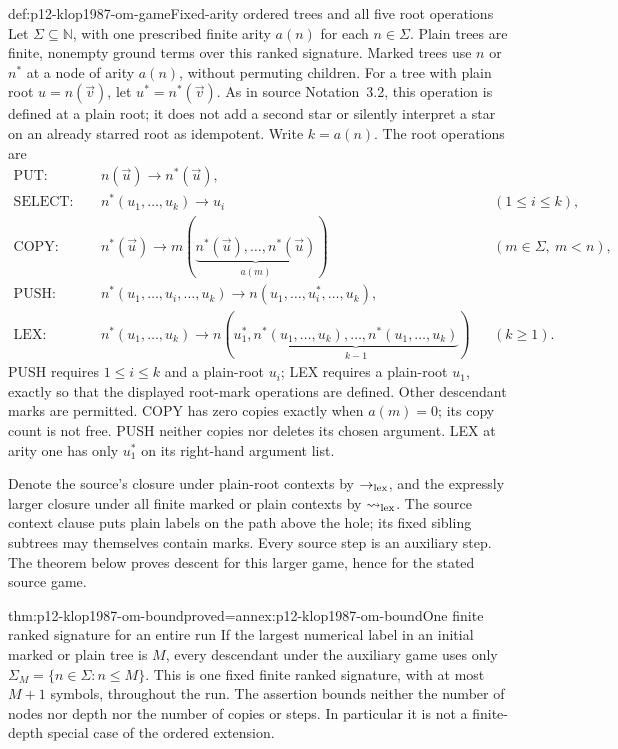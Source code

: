 \begin{hbdefinition}{def:p12-klop1987-om-game}{Fixed-arity ordered trees and all five root operations}
Let \(\Sigma\subseteq\mathbb N\), with one prescribed finite arity
\(a(n)\) for each \(n\in\Sigma\). Plain trees are finite, nonempty
ground terms over this ranked signature. Marked trees use \(n\) or
\(n^*\) at a node of arity \(a(n)\), without permuting children.
For a tree with plain root \(u=n(\vec v)\), let
\(u^*=n^*(\vec v)\). As in source Notation~3.2, this operation is
defined at a plain root; it does not add a second star or silently
interpret a star on an already starred root as idempotent.
Write \(k=a(n)\). The root operations are
\begin{align*}
 \mathrm{PUT}:\quad &n(\vec u)\longrightarrow n^*(\vec u),\\
 \mathrm{SELECT}:\quad &n^*(u_1,\ldots,u_k)\longrightarrow u_i
       &&(1\leq i\leq k),\\
 \mathrm{COPY}:\quad &n^*(\vec u)\longrightarrow
       m(\underbrace{n^*(\vec u),\ldots,n^*(\vec u)}_{a(m)})
       &&(m\in\Sigma,\ m<n),\\
 \mathrm{PUSH}:\quad &n^*(u_1,\ldots,u_i,\ldots,u_k)
       \longrightarrow n(u_1,\ldots,u_i^*,\ldots,u_k),\\
 \mathrm{LEX}:\quad &n^*(u_1,\ldots,u_k)\longrightarrow
       n(u_1^*,\underbrace{n^*(u_1,\ldots,u_k),\ldots,
                      n^*(u_1,\ldots,u_k)}_{k-1})
       &&(k\geq1).
\end{align*}
PUSH requires \(1\leq i\leq k\) and a plain-root \(u_i\);
LEX requires a plain-root \(u_1\), exactly so that the displayed
root-mark operations are defined. Other descendant marks are permitted.
COPY has zero copies exactly when \(a(m)=0\); its copy count is not
free. PUSH neither copies nor deletes its chosen argument. LEX at
arity one has only \(u_1^*\) on its right-hand argument list.

Denote the source's closure under plain-root contexts by
\(\to_{\rm lex}\), and the expressly larger closure under all
finite marked or plain contexts by \(\rightsquigarrow_{\rm lex}\).
The source context clause puts plain labels on the path above the
hole; its fixed sibling subtrees may themselves contain marks.
Every source step is an auxiliary step. The theorem below proves
descent for this larger game, hence for the stated source game.
\end{hbdefinition}

\begin{hblemma}{thm:p12-klop1987-om-bound}{proved=annex:p12-klop1987-om-bound}{One finite ranked signature for an entire run}
If the largest numerical label in an initial marked or plain tree is
\(M\), every descendant under the auxiliary game uses only
\(\Sigma_M=\{n\in\Sigma:n\leq M\}\). This is one fixed finite
ranked signature, with at most \(M+1\) symbols, throughout the run.
The assertion bounds neither the number of nodes nor depth nor the
number of copies or steps. In particular it is not a finite-depth
special case of the ordered extension.
\end{hblemma}

